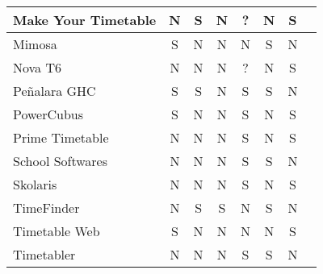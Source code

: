 \documentclass{subfiles}
\begin{document}
\begin{table}[htb]
\begin{center}
{\begin{threeparttable}
\begin{tabular}{| l | c | c | c | c | c | c | c | }
				Make Your Timetable & N & S & N & ? & N & S \\\hline%
				Mimosa				& S & N & N & N & S & N \\\hline%
				Nova T6             & N & N & N & ? & N & S \\\hline%
				Peñalara GHC		& S & S & N & S & S & N \\\hline%
				PowerCubus 	    	& S & N & N & S & N & S \\\hline%
				Prime Timetable     & N & N & N & S & N & S \\\hline%
				School Softwares    & N & N & N & S & S & N \\\hline%
				Skolaris			& N & N & N & S & N & S \\\hline%
				TimeFinder          & N & S & S & N & S & N \\\hline%
				Timetable Web 	    & S & N & N & N & N & S \\\hline%
				Timetabler          & N & N & N & S & S & N \\\hline%

\end{tabular}
\end{threeparttable}}
\end{center}
\end{table}
\end{document}
